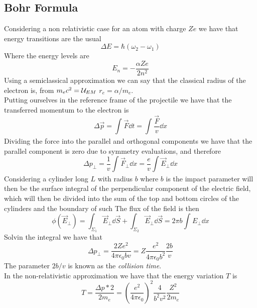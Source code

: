 \documentclass[../qm.tex]{subfiles}
\begin{document}
\subsection{Bohr Formula}
Considering a non relativistic case for an atom with charge $Ze$ we have that energy transitions are the usual
\begin{equation*}
	\Delta E=\hbar(\omega_2-\omega_1)
\end{equation*}
Where the energy levels are
\begin{equation*}
	E_n=-\frac{\alpha Ze}{2n^2}
\end{equation*}
Using a semiclassical approximation we can say that the classical radius of the electron is, from $m_ec^2=\mathcal{U}_{EM}$ $r_e=\alpha/m_e$.\\
Putting ourselves in the reference frame of the projectile we have that the transferred momentum to the electron is
\begin{equation*}
	\Delta\vec{p}=\int_{}^{}\vec{F}\dd t=\int_{}^{}\frac{\vec{F}}{v}\dd x
\end{equation*}
Dividing the force into the parallel and orthogonal components we have that the parallel component is zero due to symmetry evaluations, and therefore
\begin{equation}
	\Delta p_{\perp}=\frac{1}{v}\int_{}^{}\vec{F}_{\perp}\dd x=\frac{e}{v}\int_{}^{}\vec{E}_{\perp}\dd x
	\label{eq:orthmomvar}
\end{equation}
Considering a cylinder long $L$ with radius $b$ where $b$ is the impact parameter will then be the surface integral of the perpendicular component of the electric field, which will then be divided into the sum of the top and bottom circles of the cylinders and the boundary of such
The flux of the field is then
\begin{equation*}
	\phi(\vec{E}_\perp)=\int_{\Sigma_1}^{}\vec{E}_\perp\dd\vec{S}+\int_{\Sigma_2}^{}\vec{E}_\perp\dd\vec{S}=2\pi b\int_{}^{}E_\perp\dd x
\end{equation*}
Solvin the integral we have that
\begin{equation*}
	\Delta p_\perp=\frac{2Ze^2}{4\pi\epsilon_0 bv}=Z\frac{e^2}{4\pi\epsilon_0 b^2}\frac{2b}{v}
\end{equation*}
The parameter $2b/v$ is known as the \emph{collision time}.\\
In the non-relativistic approximation we have that the energy variation $T$ is
\begin{equation*}
	T=\frac{\Delta p* 2}{2m_e}=\left( \frac{e^2}{4\pi\epsilon_0} \right)^2\frac{4}{b^2v^2}\frac{Z^2}{2m_e}
\end{equation*}
\end{document}

